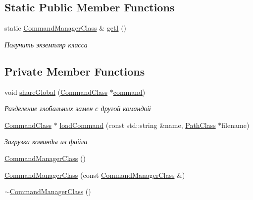 \subsection*{Static Public Member Functions}
\begin{DoxyCompactItemize}
\item 
static \hyperlink{class_command_manager_class}{Command\+Manager\+Class} \& \hyperlink{class_command_manager_class_a5086ba410f5bb7af25db58e9c5b16d27}{getI} ()
\begin{DoxyCompactList}\small\item\em Получить экземпляр класса \end{DoxyCompactList}\end{DoxyCompactItemize}
\subsection*{Private Member Functions}
\begin{DoxyCompactItemize}
\item 
void \hyperlink{class_command_manager_class_a4b6e9c23906c953b4a89e480595d9da8}{share\+Global} (\hyperlink{class_command_class}{Command\+Class} $\ast$\hyperlink{class_command_manager_class_aff5b4b6301c24b585b22c6abaf4f3131}{command})
\begin{DoxyCompactList}\small\item\em Разделение глобальных замен с другой командой \end{DoxyCompactList}\item 
\hyperlink{class_command_class}{Command\+Class} $\ast$ \hyperlink{class_command_manager_class_a71c3e93ec7708efac79ea5a59aaa9183}{load\+Command} (const std\+::string \&name, \hyperlink{class_path_class}{Path\+Class} $\ast$filename)
\begin{DoxyCompactList}\small\item\em Загрузка команды из файла \end{DoxyCompactList}\item 
\hyperlink{class_command_manager_class_a0d58fc4683ae6ea28cab3bca4347df40}{Command\+Manager\+Class} ()
\item 
\hyperlink{class_command_manager_class_aab750a4fbe6478f37b86e7462e262018}{Command\+Manager\+Class} (const \hyperlink{class_command_manager_class}{Command\+Manager\+Class} \&)
\item 
\hyperlink{class_command_manager_class_aeffeaa34f8b6c8022f21c69e5ead4279}{$\sim$\+Command\+Manager\+Class} ()
\end{DoxyCompactItemize}
